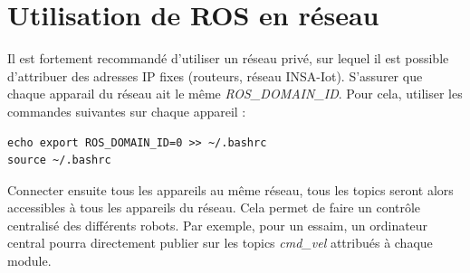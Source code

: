 \chapter{Utilisation de ROS en réseau}

Il est fortement recommandé d'utiliser un réseau privé, sur lequel il est possible d'attribuer des adresses IP fixes (routeurs, réseau INSA-Iot). S'assurer que chaque apparail du réseau ait le même \textit{ROS\_DOMAIN\_ID}. Pour cela, utiliser les commandes suivantes sur chaque appareil : 
\begin{lstlisting}[style=commandstyle]
echo export ROS_DOMAIN_ID=0 >> ~/.bashrc
source ~/.bashrc
\end{lstlisting}

\noindent Connecter ensuite tous les appareils au même réseau, tous les topics seront alors accessibles à tous les appareils du réseau. Cela permet de faire un contrôle centralisé des différents robots. Par exemple, pour un essaim, un ordinateur central pourra directement publier sur les topics \textit{cmd\_vel} attribués à chaque module.


